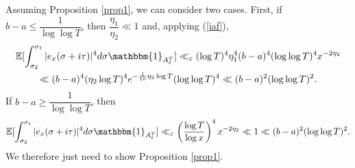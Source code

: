 \documentclass{article}
\newcommand{\1}{\mathds{1}}
\numberwithin{equation}{section}
\newcommand{\eps}{\varepsilon}
\renewcommand{\leq}{\leqslant}
\renewcommand{\geq}{\geqslant}
\newcommand{\E}{\mathbb{E}}
\theoremstyle{plain} %
\begin{document}
Assuming Proposition \ref{prop1}, we can consider two cases.
First,  if $b - a \leq \dfrac{1}{\log \log T}$, then $\dfrac{\eta_1}{\eta_2} \ll 1$ and, applying (\ref{iaf}),
    \begin{multline*}
            \E[\int_{\sigma_2}^{\sigma_1}|e_x(\sigma + i \tau)|^4 d \sigma\mathbbm{1}_{A_\eps^T}] 
             \ll_\eps (\log T)^4 \eta_1^4 (b-a)^4 (\log \log T)^4 x^{-2\eta_2} \\
             \ll (b-a)^4 (\eta_2 \log T)^4 e^{-\frac{1}{10} \eta_2 \log T}(\log \log T)^4 
             \ll (b-a)^2 (\log \log T)^2.
    \end{multline*}
If $b-a \geq \dfrac{1}{\log \log T}$, then
    \begin{equation}
            \E[\int_{\sigma_2}^{\sigma_1}|e_x(\sigma + i \tau)|^4 d \sigma\mathbbm{1}_{A_\eps^T}] 
             \ll_\eps \left(\frac{\log T}{\log x}\right)^4 x^{-2 \eta_2} 
             \ll 1  \ll (b-a)^2 (\log \log T)^2.
    \end{equation}
We therefore just need to show Proposition \ref{prop1}.
\end{document}
